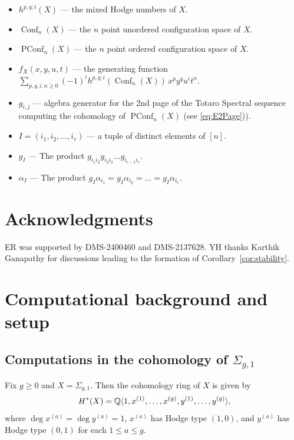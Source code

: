 \documentclass[11pt,reqno]{amsproc}
\numberwithin{equation}{section}
\theoremstyle{definition}
\theoremstyle{remark}
\newcommand\Q{{\mathbb Q}}
\DeclarePairedDelimiter{\pairing}{\langle}{\rangle}
\DeclareMathOperator{\Conf}{Conf}
\DeclareMathOperator{\PConf}{PConf}
\newcommand{\spp}[1]{^{(#1)}}
\begin{document}
\begin{itemize}
\item $h^{p,q;i}(X)$ --- the mixed Hodge numbers of $X$.\\

\item $\Conf_n(X)$ --- the $n$ point unordered configuration space of $X$. \\

\item $\PConf_n(X)$ --- the $n$ point ordered configuration space of $X$.\\

\item $f_X(x,y,u,t)$ --- the generating function $\sum_{p,q,i,n\geq 0} (-1)^i h^{p,q;i}(\Conf_n(X))\, x^p y^q u^i t^n$.\\

\item $g_{i,j}$ --- algebra generator for the 2nd page of the Totaro Spectral sequence computing the cohomology of $\PConf_n(X)$ (see \eqref{eq:E2Page})).\\

\item $I=(i_1,i_2,\dots,i_r)$ --- a tuple of distinct elements of $[n]$.\\

\item $g_I$ --- The product $g_{i_1i_2} g_{i_2i_3}\dots g_{i_{r-1}i_r}$.\\

\item $\alpha_I$ --- The product $g_{I}\alpha_{i_1} = g_{I}\alpha_{i_2} = \ldots = g_{I}\alpha_{i_r}$.\\

\end{itemize}

\section*{Acknowledgments}
ER was supported by DMS-2400460 and DMS-2137628. YH thanks Karthik Ganapathy for discussions leading to the formation of Corollary~\ref{cor:stability}.


\section{Computational background and setup}
\subsection{Computations in the cohomology of $\Sigma_{g,1}$}
Fix $g\geq 0$ and $X=\Sigma_{g,1}$. Then the cohomology ring of $X$ is given by
\[\
H^*(X)=\Q\pairing{1,x\spp{1},\dots,x\spp{g},y\spp{1},\dots,y\spp{g}},
\]
where $\deg x\spp{a}=\deg y\spp{a}=1$, $x\spp{a}$ has Hodge type $(1,0)$, and $y\spp{a}$ has Hodge type $(0,1)$ for each $1\leq a\leq g$.
\end{document}
